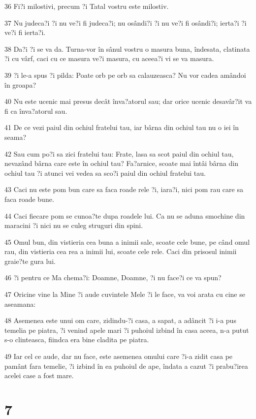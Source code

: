 \par 36 Fi?i milostivi, precum ?i Tatal vostru este milostiv.
\par 37 Nu judeca?i ?i nu ve?i fi judeca?i; nu osândi?i ?i nu ve?i fi osândi?i; ierta?i ?i ve?i fi ierta?i.
\par 38 Da?i ?i se va da. Turna-vor în sânul vostru o masura buna, îndesata, clatinata ?i cu vârf, caci cu ce masura ve?i masura, cu aceea?i vi se va masura.
\par 39 ?i le-a spus ?i pilda: Poate orb pe orb sa calauzeasca? Nu vor cadea amândoi în groapa?
\par 40 Nu este ucenic mai presus decât înva?atorul sau; dar orice ucenic desavâr?it va fi ca înva?atorul sau.
\par 41 De ce vezi paiul din ochiul fratelui tau, iar bârna din ochiul tau nu o iei în seama?
\par 42 Sau cum po?i sa zici fratelui tau: Frate, lasa sa scot paiul din ochiul tau, nevazând bârna care este în ochiul tau? Fa?arnice, scoate mai întâi bârna din ochiul tau ?i atunci vei vedea sa sco?i paiul din ochiul fratelui tau.
\par 43 Caci nu este pom bun care sa faca roade rele ?i, iara?i, nici pom rau care sa faca roade bune.
\par 44 Caci fiecare pom se cunoa?te dupa roadele lui. Ca nu se aduna smochine din maracini ?i nici nu se culeg struguri din spini.
\par 45 Omul bun, din vistieria cea buna a inimii sale, scoate cele bune, pe când omul rau, din vistieria cea rea a inimii lui, scoate cele rele. Caci din prisosul inimii graie?te gura lui.
\par 46 ?i pentru ce Ma chema?i: Doamne, Doamne, ?i nu face?i ce va spun?
\par 47 Oricine vine la Mine ?i aude cuvintele Mele ?i le face, va voi arata cu cine se aseamana:
\par 48 Asemenea este unui om care, zidindu-?i casa, a sapat, a adâncit ?i i-a pus temelia pe piatra, ?i venind apele mari ?i puhoiul izbind în casa aceea, n-a putut s-o clinteasca, fiindca era bine cladita pe piatra.
\par 49 Iar cel ce aude, dar nu face, este asemenea omului care ?i-a zidit casa pe pamânt fara temelie, ?i izbind în ea puhoiul de ape, îndata a cazut ?i prabu?irea acelei case a fost mare.

\chapter{7}

